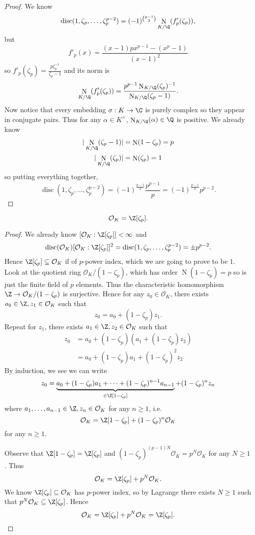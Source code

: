 \documentclass[a4paper]{article}
\renewcommand*{\O}{\mathcal{O}}
\DeclareMathOperator{\n}{N}
\DeclareMathOperator{\disc}{disc}
\begin{document}
\begin{proof}
  We know 
  \[
    \disc(1, \zeta_p, \dots, \zeta_p^{p - 2}) = (-1)^{\binom{p - 1}{2}} \n_{K/\Q} (f'_p(\zeta_p)),
  \]
  but
  \[
    f'_p(x) = \frac{(x - 1) p x^{p - 1} - (x^p - 1)}{(x - 1)^2}
  \]
  so \(f'_p(\zeta_p) = \frac{p\zeta_p^{-1}}{\zeta_p - 1}\) and its norm is
  \[
    \n_{K/\Q}(f'_p(\zeta_p)) = \frac{p^{p - 1} \n_{K/\Q}(\zeta_p)^{-1}}{\n_{K/\Q}(\zeta_p - 1)}.
  \]
  Now notice that every embedding \(\sigma: K \to \C\) is purely complex so they appear in conjugate pairs. Thus for any \(\alpha \in K^\times\), \(\n_{K/\Q}(\alpha) \in \Q\) is positive. We already know
  \begin{align*}
    |\n_{K/\Q}(\zeta_p - 1)| &= \n(1 - \zeta_p) = p \\
    |\n_{K/\Q}(\zeta_p)| &= \n(\zeta_p) = 1
  \end{align*}
  so putting everything together,
  \[
    \disc(1, \zeta_p, \dots, \zeta_p^{p - 2}) = (-1)^{\frac{p - 1}{2}} \frac{p^{p - 1}}{p} = (-1)^{\frac{p - 1}{2}} p^{p - 2}.
  \]
\end{proof}

\begin{proposition}
  \[
    \O_K = \Z[\zeta_p].
  \]
\end{proposition}

\begin{proof}
  We already know \([\O_K: \Z[\zeta_p]] < \infty\) and
  \[
    \disc(\O_K) [\O_K: \Z[\zeta_p]]^2 = \disc(1, \zeta_p, \dots, \zeta_p^{p - 2}) = \pm p^{p - 2}.
  \]
  Hence \(\Z[\zeta_p] \subseteq \O_K\) if of \(p\)-power index, which we are going to prove to be \(1\). Look at the quotient ring \(\O_K/(1 - \zeta_p)\), which has order \(\n(1 - \zeta_p) = p\) so is just the finite field of \(p\) elements. Thus the characteristic homomorphism \(\Z \to \O_K/(1 - \zeta_p)\) is surjective. Hence for any \(z_0 \in \O_K\), there exists \(a_0 \in \Z, z_1 \in \O_K\) such that
  \[
    z_0 = a_0 + (1 - \zeta_p)z_1.
  \]
  Repeat for \(z_1\), there exists \(a_1 \in \Z, z_2 \in \O_K\) such that
  \begin{align*}
    z_0 &= a_0 + (1 - \zeta_p)(a_1 + (1 - \zeta_p)z_2) \\
        &= a_0 + (1 - \zeta_p)a_1 + (1 - \zeta_p)^2z_2
  \end{align*}
  By induction, we see we can write
  \[
    z_0 = \underbrace{a_0 + (1 - \zeta_p)a_1 + \dots + (1 - \zeta_p)^{n - 1}a_{n - 1}}_{\in \Z[1 - \zeta_p]} + (1 - \zeta_p)^n z_n
  \]
  where \(a_1, \dots, a_{n - 1} \in \Z, z_n \in \O_K\) for any \(n \geq 1\), i.e.
  \[
    \O_K = \Z[1 - \zeta_p] + (1 - \zeta_p)^n \O_K
  \]
  for any \(n \geq 1\).

  Observe that \(\Z[1 - \zeta_p] = \Z[\zeta_p]\) and \((1 - \zeta_p)^{(p - 1)N} \O_K = p^N \O_K\) for any \(N \geq 1\). Thus
  \[
    \O_K = \Z[\zeta_p] + p^N\O_K.
  \]
  We know \(\Z[\zeta_p] \subseteq \O_K\) has \(p\)-power index, so by Lagrange there exists \(N \geq 1\) such that \(p^N \O_K \subseteq \Z[\zeta_p]\). Hence
  \[
    \O_K = \Z[\zeta_p] + p^N\O_K = \Z[\zeta_p].
  \]
\end{proof}
\end{document}

